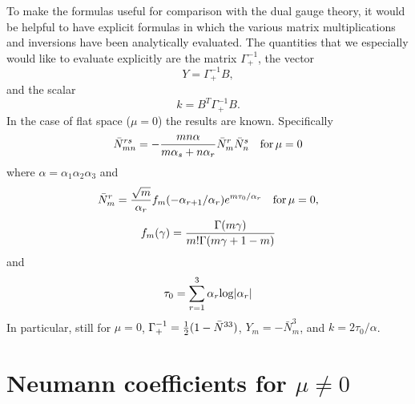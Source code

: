\documentclass[a4paper,12pt]{article}
\begin{document}
To make the formulas useful for comparison with the dual gauge
theory, it would be helpful to have explicit formulas in which the
various matrix multiplications and inversions have been
analytically evaluated. The quantities that we especially would
like to evaluate explicitly are the matrix $\Gamma_+^{-1}$, the
vector
\begin{equation}
Y =\Gamma_+^{-1} B,
\end{equation}
and the scalar
\begin{equation}
k = B^T \Gamma_+^{-1} B.
\end{equation}
In the case of flat space ($\mu
=0$) the results are known. Specifically
\begin{equation} \label{factorize}
\bar N_{mn}^{rs} = - {mn\alpha \over m\alpha_s + n \alpha_r} \bar
N_m^r \bar N_n^s \quad {\rm for}\,  \mu =0
\end{equation}
where $\alpha = \alpha_1 \alpha_2 \alpha_3$ and
\begin{equation} \label{Nrflat}
\bar N_m^r = {\sqrt{m} \over \alpha_r} f_m(-\alpha_{r+1}/\alpha_r)
e^{m\tau_0 /\alpha_r} \quad {\rm for}\,  \mu =0,
\end{equation}
\begin{equation}
f_m(\gamma) = {\Gamma(m\gamma) \over m! \Gamma (m\gamma +1 -m)}
\end{equation}
and
\begin{equation}
\tau_0 = \sum_{r=1}^3 \alpha_r {\rm log} |\alpha_r|
\end{equation}
In particular, still for $\mu =0$, $\Gamma_+^{-1} = {1\over 2} (1
- \bar N^{33})$, $Y_m = - \bar N_m^3$, and $k = 2\tau_0/\alpha$.

\section{Neumann coefficients for $\mu \neq 0$}
\end{document}
